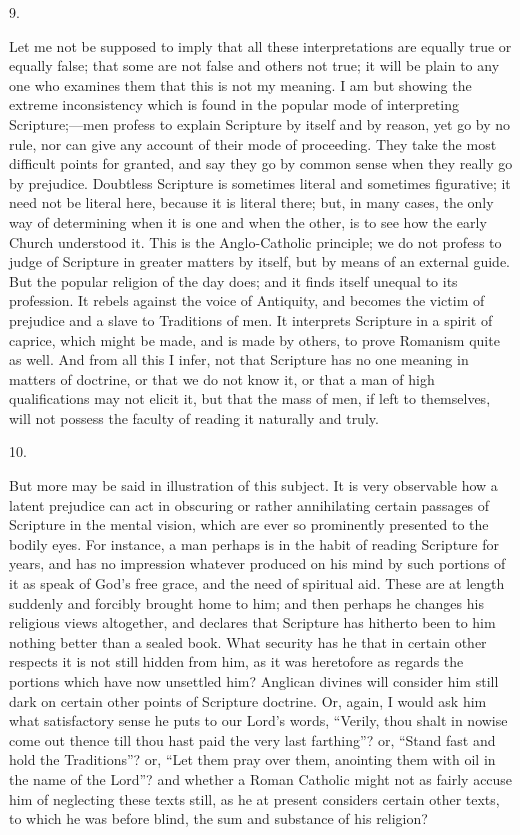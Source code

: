 9.

Let me not be supposed to imply that all these interpretations are
equally true or equally false; that some are not false and others not
true; it will be plain to any one who examines them that this is not
my meaning. I am but showing the extreme inconsistency which is found
in the popular mode of interpreting Scripture;—men profess to
explain Scripture by itself and by reason, yet go by no rule, nor can
give any account of their mode of proceeding. They take the most
difficult points for granted, and say they go by common sense when
they really go by prejudice. Doubtless Scripture is sometimes literal
and sometimes figurative; it need not be literal here, because it is
literal there; but, in many cases, the only way of determining when it
is one and when the other, is to see how the early Church understood
it. This is the Anglo-Catholic principle; we do not profess to judge
of Scripture in greater matters by itself, but by means of an external
guide. But the popular religion of the day does; and it finds itself
unequal to its profession. It rebels against the voice of Antiquity, and becomes the victim of prejudice and a slave to
Traditions of men. It interprets Scripture in a spirit of caprice,
which might be made, and is made by others, to prove Romanism quite as
well. And from all this I infer, not that Scripture has no one meaning
in matters of doctrine, or that we do not know it, or that a man of
high qualifications may not elicit it, but that the mass of men, if
left to themselves, will not possess the faculty of reading it
naturally and truly.

10.

But more may be said in illustration of this subject. It is very
observable how a latent prejudice can act in obscuring or rather
annihilating certain passages of Scripture in the mental vision, which
are ever so prominently presented to the bodily eyes. For instance, a
man perhaps is in the habit of reading Scripture for years, and has no
impression whatever produced on his mind by such portions of it as
speak of God's free grace, and the need of spiritual aid. These are at
length suddenly and forcibly brought home to him; and then perhaps he
changes his religious views altogether, and declares that Scripture
has hitherto been to him nothing better than a sealed book. What
security has he that in certain other respects it is not still hidden
from him, as it was heretofore as regards the portions which have now
unsettled him? Anglican divines will consider him still dark on
certain other points of Scripture doctrine. Or, again, I would ask him
what satisfactory sense he puts to our Lord's words, ``Verily,
thou shalt in nowise come out thence till thou hast paid the very last
farthing''? or, ``Stand fast and hold the Traditions''?
or, ``Let them pray over them, anointing them with oil in the name
of the Lord''? and whether a Roman Catholic might not as fairly
accuse him of neglecting these texts still, as he at present considers
certain other texts, to which he was before blind, the sum and
substance of his religion?

